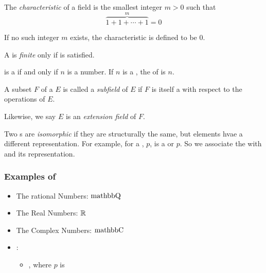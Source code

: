 \begin{definition}[Characteristic]\label{def:Field_Characteristic}
  The \emph{characteristic} of a field is the smallest integer $m > 0$ such that
  \begin{equation}\label{eq:Field_Characteristic}
    \overbrace{1 + 1 + \cdots + 1}^{m} = 0
  \end{equation}

  If no such integer $m$ exists, the characteristic is defined to be 0.
\end{definition}

\begin{definition}\label{def:Finite_Field}
  A  is \emph{finite} only if  is satisfied.
\end{definition}

\begin{theorem}\label{thm:Finite_Field}
  \TextIntsModN{} is a  if and only if $n$ is a  number.
  If $n$ is a , the  of \TextIntsModN{} is $n$.
\end{theorem}

\begin{definition}[Subfield]\label{def:Subfield}
  A subset $F$ of a  $E$ is called a \emph{subfield} of $E$ if $F$ is itself a  with respect to the operations of $E$.

  \begin{remark}\label{rmk:Extension_Field}
    Likewise, we say $E$ is an \emph{extension field} of $F$.
  \end{remark}
\end{definition}

\begin{definition}[Isomorphism]\label{def:Isomorphism}
  Two s are \emph{isomorphic} if they are structurally the same, but elements hvae a different representation.
  For example, for a , $p$,  is a  or  $p$.
  So we associate the   with  and its representation.
\end{definition}

\subsubsection{Examples of }\label{subsubsec:Examples_of_Fields}
\begin{itemize}[noitemsep]
\item The rational Numbers: $\operatorname{mathbb{Q}}$
\item The Real Numbers: $\operatorname{\mathbb{R}}$
\item The Complex Numbers: $\operatorname{mathbb{C}}$
\item {}:
  \begin{itemize}[noitemsep]
  \item {}, where $p$ is 
  \end{itemize}
\end{itemize}

